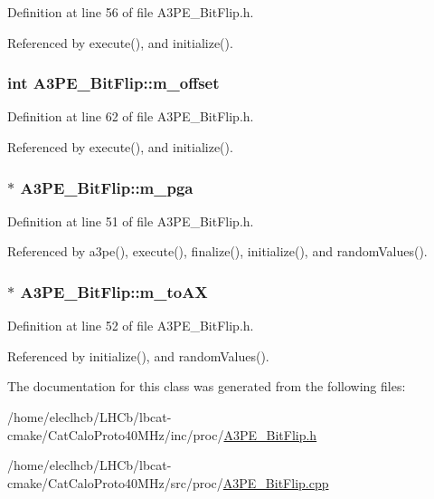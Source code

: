 Definition at line 56 of file A3PE\_\-BitFlip.h.

Referenced by execute(), and initialize().\hypertarget{classA3PE__BitFlip_ac0797dd65b1aeab96647d795e2f1a447}{
\subsubsection[{m\_\-offset}]{\setlength{\rightskip}{0pt plus 5cm}int {\bf A3PE\_\-BitFlip::m\_\-offset}}}
\label{classA3PE__BitFlip_ac0797dd65b1aeab96647d795e2f1a447}


Definition at line 62 of file A3PE\_\-BitFlip.h.

Referenced by execute(), and initialize().\hypertarget{classA3PE__BitFlip_ad20d7abccf27fa87b931cb77cd6b5e41}{
\subsubsection[{m\_\-pga}]{$\ast$ {\bf A3PE\_\-BitFlip::m\_\-pga}}}
\label{classA3PE__BitFlip_ad20d7abccf27fa87b931cb77cd6b5e41}


Definition at line 51 of file A3PE\_\-BitFlip.h.

Referenced by a3pe(), execute(), finalize(), initialize(), and randomValues().\hypertarget{classA3PE__BitFlip_a0ac416167c83d423cda4e09a892b5255}{
\subsubsection[{m\_\-toAX}]{$\ast$ {\bf A3PE\_\-BitFlip::m\_\-toAX}}}
\label{classA3PE__BitFlip_a0ac416167c83d423cda4e09a892b5255}


Definition at line 52 of file A3PE\_\-BitFlip.h.

Referenced by initialize(), and randomValues().

The documentation for this class was generated from the following files:\begin{DoxyCompactItemize}
\item 
/home/eleclhcb/LHCb/lbcat-\/cmake/CatCaloProto40MHz/inc/proc/\hyperlink{A3PE__BitFlip_8h}{A3PE\_\-BitFlip.h}\item 
/home/eleclhcb/LHCb/lbcat-\/cmake/CatCaloProto40MHz/src/proc/\hyperlink{A3PE__BitFlip_8cpp}{A3PE\_\-BitFlip.cpp}\end{DoxyCompactItemize}
